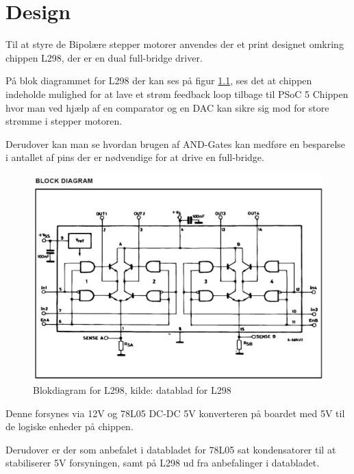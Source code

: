﻿\chapter{Design}

Til at styre de Bipolære stepper motorer anvendes der et print designet omkring chippen L298, der er en dual full-bridge driver.

På blok diagrammet for L298 der kan ses på figur \ref{blok298}, ses det at chippen indeholde mulighed for at lave et strøm feedback loop tilbage til PSoC 5 Chippen hvor man ved hjælp af en comparator og en DAC kan sikre sig mod for store strømme i stepper motoren. 

Derudover kan man se hvordan brugen af AND-Gates kan medføre en besparelse i antallet af pins der er nødvendige for at drive en full-bridge.

\begin{figure}[H]
	\centering
	\includegraphics[scale=0.5]{billeder/blokdiagramL298}
	\caption{Blokdiagram for L298, kilde: datablad for L298}
	\label{blok298}
\end{figure}

Denne forsynes via 12V og 78L05 DC-DC 5V konverteren på boardet med 5V til de logiske enheder på chippen.

Derudover er der som anbefalet i databladet for 78L05 sat kondensatorer til at stabiliserer 5V forsyningen, samt på L298 ud fra anbefalinger i databladet.

